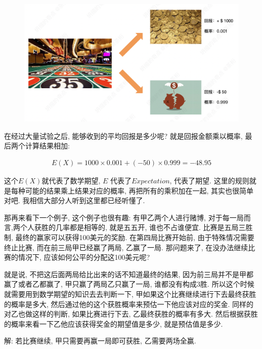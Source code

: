 \begin{figure}[ht]
  \centering
  \includegraphics[width=1\textwidth]{asset/86da64b2-45f2-42c2-add4-d7db67f5cf82.png}
  \caption{}
  \label{fig:img5_3}
\end{figure}

在经过大量试验之后, 能够收到的平均回报是多少呢? 就是回报金额乘以概率, 最后两个计算结果相加:

\begin{align*}
  E(X) = 1000 \times 0.001 + (-50) \times 0.999 = -48.95
\end{align*}

这个$E(X)$就代表了数学期望, $E$ 代表了$\mathord{Expectation}$, 代表了期望. 这里的规则就是每种可能的结果乘上结果对应的概率, 再把所有的乘积加在一起, 其实也很简单对吧. 我相信大部分人听到这里都已经听懂了. 

那再来看下一个例子, 这个例子也很有趣: 有甲乙两个人进行赌博, 对于每一局而言,两个人获胜的几率都是相等的, 就是五五开, 谁也不占谁便宜. 比赛是五局三胜制, 最终的赢家可以获得100美元的奖励. 在第四局比赛开始前, 由于特殊情况需要终止比赛, 而在前三局甲已经赢了两局, 乙赢了一局. 那问题来了, 在没办法继续比赛的情况下, 应该如何公平的分配这100美元呢? 

就是说, 不把这后面两局给比出来的话不知道最终的结果, 因为前三局并不是甲都赢了或者乙都赢了, 甲只赢了两局乙只赢了一局, 谁都没有构成3胜. 所以这个时候就需要用到数学期望的知识去去判断一下, 甲如果这个比赛继续进行下去最终获胜的概率是多大, 然后通过他的这个获胜概率来预估一下他应该对应的奖金. 同样的对乙也做这样的判断, 如果比赛进行下去, 乙最终获胜的概率有多大. 然后根据获胜的概率来看一下乙他应该获得奖金的期望值是多少, 就是预估值是多少.

解: 若比赛继续, 甲只需要再赢一局即可获胜, 乙需要两场全赢. 

